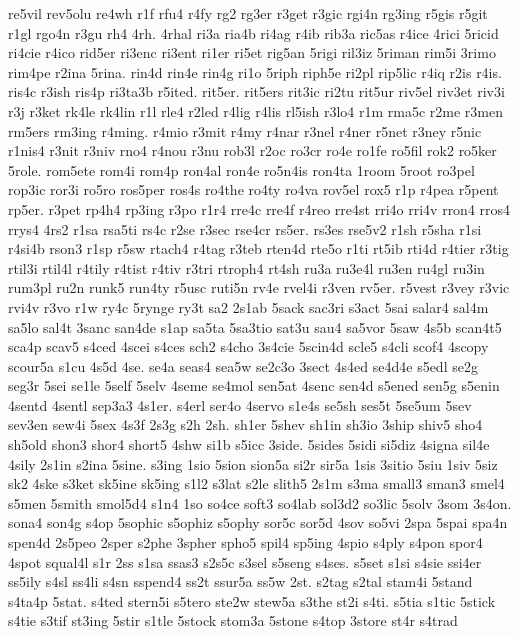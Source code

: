 {re5vil
rev5olu
re4wh
r1f
rfu4
r4fy
rg2
rg3er
r3get
r3gic
rgi4n
rg3ing
r5gis
r5git
r1gl
rgo4n
r3gu
rh4
4rh.
4rhal
ri3a
ria4b
ri4ag
r4ib
rib3a
ric5as
r4ice
4rici
5ricid
ri4cie
r4ico
rid5er
ri3enc
ri3ent
ri1er
ri5et
rig5an
5rigi
ril3iz
5riman
rim5i
3rimo
rim4pe
r2ina
5rina.
rin4d
rin4e
rin4g
ri1o
5riph
riph5e
ri2pl
rip5lic
r4iq
r2is
r4is.
ris4c
r3ish
ris4p
ri3ta3b
r5ited.
rit5er.
rit5ers
rit3ic
ri2tu
rit5ur
riv5el
riv3et
riv3i
r3j
r3ket
rk4le
rk4lin
r1l
rle4
r2led
r4lig
r4lis
rl5ish
r3lo4
r1m
rma5c
r2me
r3men
rm5ers
rm3ing
r4ming.
r4mio
r3mit
r4my
r4nar
r3nel
r4ner
r5net
r3ney
r5nic
r1nis4
r3nit
r3niv
rno4
r4nou
r3nu
rob3l
r2oc
ro3cr
ro4e
ro1fe
ro5fil
rok2
ro5ker
5role.
rom5ete
rom4i
rom4p
ron4al
ron4e
ro5n4is
ron4ta
1room
5root
ro3pel
rop3ic
ror3i
ro5ro
ros5per
ros4s
ro4the
ro4ty
ro4va
rov5el
rox5
r1p
r4pea
r5pent
rp5er.
r3pet
rp4h4
rp3ing
r3po
r1r4
rre4c
rre4f
r4reo
rre4st
rri4o
rri4v
rron4
rros4
rrys4
4rs2
r1sa
rsa5ti
rs4c
r2se
r3sec
rse4cr
rs5er.
rs3es
rse5v2
r1sh
r5sha
r1si
r4si4b
rson3
r1sp
r5sw
rtach4
r4tag
r3teb
rten4d
rte5o
r1ti
rt5ib
rti4d
r4tier
r3tig
rtil3i
rtil4l
r4tily
r4tist
r4tiv
r3tri
rtroph4
rt4sh
ru3a
ru3e4l
ru3en
ru4gl
ru3in
rum3pl
ru2n
runk5
run4ty
r5usc
ruti5n
rv4e
rvel4i
r3ven
rv5er.
r5vest
r3vey
r3vic
rvi4v
r3vo
r1w
ry4c
5rynge
ry3t
sa2
2s1ab
5sack
sac3ri
s3act
5sai
salar4
sal4m
sa5lo
sal4t
3sanc
san4de
s1ap
sa5ta
5sa3tio
sat3u
sau4
sa5vor
5saw
4s5b
scan4t5
sca4p
scav5
s4ced
4scei
s4ces
sch2
s4cho
3s4cie
5scin4d
scle5
s4cli
scof4
4scopy
scour5a
s1cu
4s5d
4se.
se4a
seas4
sea5w
se2c3o
3sect
4s4ed
se4d4e
s5edl
se2g
seg3r
5sei
se1le
5self
5selv
4seme
se4mol
sen5at
4senc
sen4d
s5ened
sen5g
s5enin
4sentd
4sentl
sep3a3
4s1er.
s4erl
ser4o
4servo
s1e4s
se5sh
ses5t
5se5um
5sev
sev3en
sew4i
5sex
4s3f
2s3g
s2h
2sh.
sh1er
5shev
sh1in
sh3io
3ship
shiv5
sho4
sh5old
shon3
shor4
short5
4shw
si1b
s5icc
3side.
5sides
5sidi
si5diz
4signa
sil4e
4sily
2s1in
s2ina
5sine.
s3ing
1sio
5sion
sion5a
si2r
sir5a
1sis
3sitio
5siu
1siv
5siz
sk2
4ske
s3ket
sk5ine
sk5ing
s1l2
s3lat
s2le
slith5
2s1m
s3ma
small3
sman3
smel4
s5men
5smith
smol5d4
s1n4
1so
so4ce
soft3
so4lab
sol3d2
so3lic
5solv
3som
3s4on.
sona4
son4g
s4op
5sophic
s5ophiz
s5ophy
sor5c
sor5d
4sov
so5vi
2spa
5spai
spa4n
spen4d
2s5peo
2sper
s2phe
3spher
spho5
spil4
sp5ing
4spio
s4ply
s4pon
spor4
4spot
squal4l
s1r
2ss
s1sa
ssas3
s2s5c
s3sel
s5seng
s4ses.
s5set
s1si
s4sie
ssi4er
ss5ily
s4sl
ss4li
s4sn
sspend4
ss2t
ssur5a
ss5w
2st.
s2tag
s2tal
stam4i
5stand
s4ta4p
5stat.
s4ted
stern5i
s5tero
ste2w
stew5a
s3the
st2i
s4ti.
s5tia
s1tic
5stick
s4tie
s3tif
st3ing
5stir
s1tle
5stock
stom3a
5stone
s4top
3store
st4r
s4trad
}
